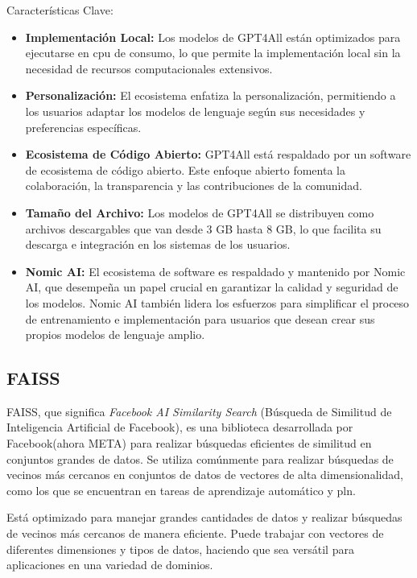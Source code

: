 Características Clave:
\begin{itemize}

\item \textbf{Implementación Local:} Los modelos de GPT4All están optimizados para ejecutarse en \acrshort{cpu} de consumo, lo que permite la implementación local sin la necesidad de recursos computacionales extensivos.
  
\item \textbf{Personalización:} El ecosistema enfatiza la personalización, permitiendo a los usuarios adaptar los modelos de lenguaje según sus necesidades y preferencias específicas.

\item \textbf{Ecosistema de Código Abierto:} GPT4All está respaldado por un software de ecosistema de código abierto. Este enfoque abierto fomenta la colaboración, la transparencia y las contribuciones de la comunidad.

\item \textbf{Tamaño del Archivo:} Los modelos de GPT4All se distribuyen como archivos descargables que van desde 3 GB hasta 8 GB, lo que facilita su descarga e integración en los sistemas de los usuarios.

\item \textbf{Nomic AI:} El ecosistema de software es respaldado y mantenido por Nomic AI, que desempeña un papel crucial en garantizar la calidad y seguridad de los modelos. Nomic AI también lidera los esfuerzos para simplificar el proceso de entrenamiento e implementación para usuarios que desean crear sus propios modelos de lenguaje amplio.
\end{itemize}

\subsection{FAISS}

FAISS, que significa \textit{Facebook AI Similarity Search} (Búsqueda de Similitud de Inteligencia Artificial de Facebook)\cite{Faiss}, es una biblioteca desarrollada por Facebook(ahora META) para realizar búsquedas eficientes de similitud en conjuntos grandes de datos. Se utiliza comúnmente para realizar búsquedas de vecinos más cercanos en conjuntos de datos de vectores de alta dimensionalidad, como los que se encuentran en tareas de aprendizaje automático y \acrlong{pln}.

Está optimizado para manejar grandes cantidades de datos y realizar búsquedas de vecinos más cercanos de manera eficiente. Puede trabajar con vectores de diferentes dimensiones y tipos de datos, haciendo que sea versátil para aplicaciones en una variedad de dominios.

